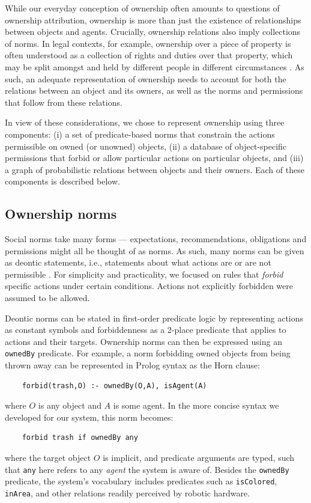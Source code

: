 \documentclass[letterpaper]{article} %
\begin{document}
While our everyday conception of ownership often amounts to questions of ownership attribution, ownership is more than just the existence of relationships between objects and agents. Crucially, ownership relations also imply collections of norms. In legal contexts, for example, ownership over a piece of property is often understood as a collection of rights and duties over that property, which may be split amongst and held by different people in different circumstances \cite{mccarty2002ownership}. As such, an adequate representation of ownership needs to account for both the relations between an object and its owners, as well as the norms and permissions that follow from these relations.

In view of these considerations, we chose to represent ownership using three components: (i) a set of predicate-based norms that constrain the actions permissible on owned (or unowned) objects, (ii) a database of object-specific permissions that forbid or allow particular actions on particular objects, and (iii) a graph of probabilistic relations between objects and their owners. Each of these components is described below.

\subsection{Ownership norms}

Social norms take many forms --- expectations, recommendations, obligations and permissions might all be thought of as norms. As such, many norms can be given as deontic statements, i.e., statements about what actions are or are not permissible \cite{malle2017networks}. For simplicity and practicality, we focused on rules that \emph{forbid} specific actions under certain conditions. Actions not explicitly forbidden were assumed to be allowed.

Deontic norms can be stated in first-order predicate logic by representing actions as constant symbols and forbiddenness as a 2-place predicate that applies to actions and their targets. Ownership norms can then be expressed using an \texttt{\small{ownedBy}} predicate. For example, a norm forbidding owned objects from being thrown away can be represented in Prolog syntax as the Horn clause:
\begin{scriptsize}
\begin{verbatim}
    forbid(trash,O) :- ownedBy(O,A), isAgent(A)
\end{verbatim}
\end{scriptsize}
where $O$ is any object and $A$ is some agent. In the more concise syntax we developed for our system, this norm becomes:
\begin{scriptsize}
\begin{verbatim}
    forbid trash if ownedBy any
\end{verbatim}
\end{scriptsize}
where the target object $O$ is implicit, and predicate arguments are typed, such that \texttt{\small{any}} here refers to any \emph{agent} the system is aware of. Besides the \texttt{\small{ownedBy}} predicate, the system's vocabulary includes predicates such as \texttt{\small{isColored}}, \texttt{\small{inArea}}, and other relations readily perceived by robotic hardware.
\end{document}
